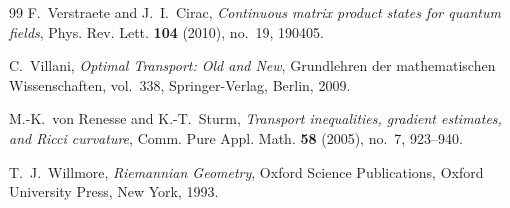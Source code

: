 \documentclass[11pt,a4paper,reqno]{amsart}
\theoremstyle{definition}
\numberwithin{equation}{section}
\begin{document}
\begin{thebibliography}{99}
F.~Verstraete and J.~I.~Cirac,
\emph{Continuous matrix product states for quantum fields},
Phys. Rev. Lett. \textbf{104} (2010), no.~19, 190405.

C.~Villani,
\emph{Optimal Transport: Old and New},
Grundlehren der mathematischen Wissenschaften, vol.~338, Springer-Verlag, Berlin, 2009.

M.-K.~von Renesse and K.-T.~Sturm,
\emph{Transport inequalities, gradient estimates, and Ricci curvature},
Comm. Pure Appl. Math. \textbf{58} (2005), no.~7, 923--940.

T.~J.~Willmore,
\emph{Riemannian Geometry},
Oxford Science Publications, Oxford University Press, New York, 1993.

\end{thebibliography}
\end{document}
